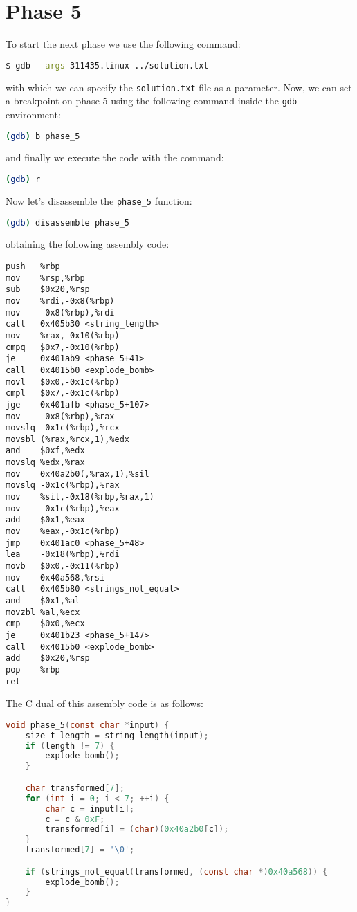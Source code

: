 \documentclass[a4paper,12pt]{report}  %
\newcommand{\lstinlinebg}[1]{\colorbox{backcolour}{\lstinline|#1|}}
\begin{document}
\section{Phase 5}
To start the next phase we use the following command:
\begin{lstlisting}[language=bash,numbers=none]
$ gdb --args 311435.linux ../solution.txt
\end{lstlisting}
with which we can specify the \lstinlinebg{solution.txt} file as a parameter.
Now, we can set a breakpoint on phase 5 using the following command inside the \lstinlinebg{gdb} environment:
\begin{lstlisting}[language=bash, numbers=none]
(gdb) b phase_5
\end{lstlisting}
and finally we execute the code with the command:
\begin{lstlisting}[language=bash, numbers=none]
(gdb) r
\end{lstlisting}
Now let's disassemble the \lstinlinebg{phase_5} function:
\begin{lstlisting}[language=bash, numbers=none]
(gdb) disassemble phase_5
\end{lstlisting}
obtaining the following assembly code:
\begin{lstlisting}[language=x86_64]
push   %rbp
mov    %rsp,%rbp
sub    $0x20,%rsp
mov    %rdi,-0x8(%rbp)
mov    -0x8(%rbp),%rdi
call   0x405b30 <string_length>
mov    %rax,-0x10(%rbp)
cmpq   $0x7,-0x10(%rbp)
je     0x401ab9 <phase_5+41>
call   0x4015b0 <explode_bomb>
movl   $0x0,-0x1c(%rbp)
cmpl   $0x7,-0x1c(%rbp)
jge    0x401afb <phase_5+107>
mov    -0x8(%rbp),%rax
movslq -0x1c(%rbp),%rcx
movsbl (%rax,%rcx,1),%edx
and    $0xf,%edx
movslq %edx,%rax
mov    0x40a2b0(,%rax,1),%sil
movslq -0x1c(%rbp),%rax
mov    %sil,-0x18(%rbp,%rax,1)
mov    -0x1c(%rbp),%eax
add    $0x1,%eax
mov    %eax,-0x1c(%rbp)
jmp    0x401ac0 <phase_5+48>
lea    -0x18(%rbp),%rdi
movb   $0x0,-0x11(%rbp)
mov    0x40a568,%rsi
call   0x405b80 <strings_not_equal>
and    $0x1,%al
movzbl %al,%ecx
cmp    $0x0,%ecx
je     0x401b23 <phase_5+147>
call   0x4015b0 <explode_bomb>
add    $0x20,%rsp
pop    %rbp
ret
\end{lstlisting}
The C dual of this assembly code is as follows:
\begin{lstlisting}[language=C,keywords={int, char, if, void, string_length, explode_bomb, const, size_t, for}]
void phase_5(const char *input) {
    size_t length = string_length(input);
    if (length != 7) {
        explode_bomb();
    }

    char transformed[7];
    for (int i = 0; i < 7; ++i) {
        char c = input[i];
        c = c & 0xF;
        transformed[i] = (char)(0x40a2b0[c]);
    }
    transformed[7] = '\0';

    if (strings_not_equal(transformed, (const char *)0x40a568)) {
        explode_bomb();
    }
}
\end{lstlisting}
\end{document}
